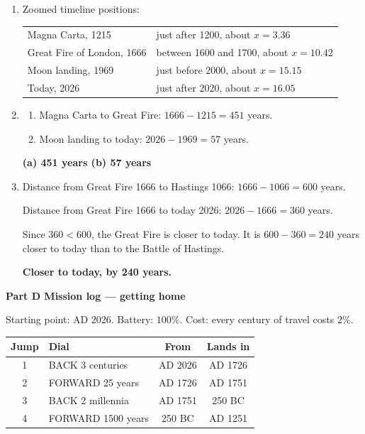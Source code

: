\documentclass[11pt,a4paper]{article}
\newcommand{\banner}[1]{{\color{ttdark}\large\bfseries #1}\par\vspace{-4pt}{\color{ttdark}\rule{\linewidth}{1pt}}\par\vspace{2pt}}
\newcommand{\ans}[1]{\textcolor{ttaccent}{\bfseries #1}}
\begin{document}
\begin{enumerate}[label=\textbf{\arabic*.}, leftmargin=*, itemsep=6pt]
\ans{(a) 975 BC \quad (b) AD 2526 \quad (c) 475 BC}

\item Zoomed timeline positions:
\begin{center}
\begin{tabular}{@{}ll@{}}
Magna Carta, 1215 & just after 1200, about $x=3.36$\\[2pt]
Great Fire of London, 1666 & between 1600 and 1700, about $x=10.42$\\[2pt]
Moon landing, 1969 & just before 2000, about $x=15.15$\\[2pt]
Today, 2026 & just after 2020, about $x=16.05$
\end{tabular}
\end{center}

\item
\begin{enumerate}[label=(\alph*), leftmargin=1.4em, itemsep=1pt]
\item Magna Carta to Great Fire: $1666-1215=451$ years.
\item Moon landing to today: $2026-1969=57$ years.
\end{enumerate}

\ans{(a) 451 years \quad (b) 57 years}

\item Distance from Great Fire 1666 to Hastings 1066:
$1666-1066=600$ years.

Distance from Great Fire 1666 to today 2026:
$2026-1666=360$ years.

Since $360<600$, the Great Fire is closer to today. It is $600-360=240$ years closer to today than to the Battle of Hastings.

\ans{Closer to today, by 240 years.}
\end{enumerate}

\banner{Part D \quad Mission log --- getting home}

Starting point: AD 2026. Battery: $100\%$. Cost: every century of travel costs $2\%$.

\begin{center}
\begin{tabular}{c|l|c|c}
\toprule
Jump & Dial & From & Lands in\\
\midrule
1 & BACK 3 centuries & AD 2026 & AD 1726\\
2 & FORWARD 25 years & AD 1726 & AD 1751\\
3 & BACK 2 millennia & AD 1751 & 250 BC\\
4 & FORWARD 1500 years & 250 BC & AD 1251\\
\bottomrule
\end{tabular}
\end{center}
\end{document}
